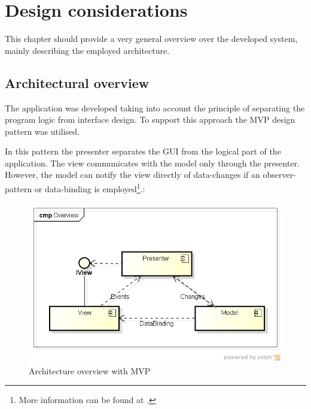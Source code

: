 \chapter{Design considerations}\label{ch:design} %

This chapter should provide a very general overview over the developed system, mainly describing the employed architecture.

\section{Architectural overview}
\label{sec:architectural overview}

The application was developed taking into account the principle of separating the program logic from interface design. To support this approach the \acf{MVP} design pattern was utilised.

In this pattern the presenter separates the \ac{GUI} from the logical part of the application. The view communicates with the model only through the presenter. However, the model can notify the view directly of  data-changes if an observer-pattern or data-binding is employed\footnote{More information can be found at \textcite{Boodhoo2006}.}.:

\begin{figure}[H]
\begin{center}
\includegraphics[width=\textwidth]{gfx/architecture_overview.png}
\caption{Architecture overview with \ac{MVP}}
\label{fig:architecture_overview}
\end{center}
\end{figure}

